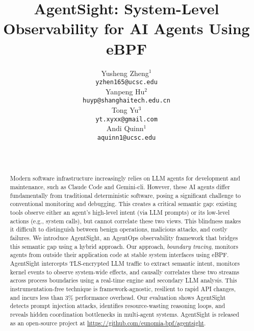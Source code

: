 \documentclass{article}
\title{AgentSight: System-Level Observability for AI Agents Using eBPF}
\author{%
  Yusheng Zheng$^{1}$ \\
  \texttt{yzhen165@ucsc.edu} \\
  \And
  Yanpeng Hu$^{2}$ \\
  \texttt{huyp@shanghaitech.edu.cn} \\
  \And
  Tong Yu$^{3}$ \\
  \texttt{yt.xyxx@gmail.com} \\
  \And
  Andi Quinn$^{1}$ \\
  \texttt{aquinn1@ucsc.edu} \\
  \And
  \multicolumn{4}{c}{$^{1}$UC Santa Cruz, Santa Cruz, CA, USA} \\
  \multicolumn{4}{c}{$^{2}$ShanghaiTech University, Shanghai, China} \\
  \multicolumn{4}{c}{$^{3}$eunomia-bpf Community, China}
}
\begin{document}
\maketitle


\begin{abstract}
    Modern software infrastructure increasingly relies on LLM agents for development and maintenance, such as Claude Code and Gemini-cli. However, these AI agents differ fundamentally from traditional deterministic software, posing a significant challenge to conventional monitoring and debugging. This creates a critical semantic gap: existing tools observe either an agent's high-level intent (via LLM prompts) or its low-level actions (e.g., system calls), but cannot correlate these two views. This blindness makes it difficult to distinguish between benign operations, malicious attacks, and costly failures. We introduce AgentSight, an AgentOps observability framework that bridges this semantic gap using a hybrid approach. Our approach, \emph{boundary tracing}, monitors agents from outside their application code at stable system interfaces using eBPF. AgentSight intercepts TLS-encrypted LLM traffic to extract semantic intent, monitors kernel events to observe system-wide effects, and causally correlates these two streams across process boundaries using a real-time engine and secondary LLM analysis. This instrumentation-free technique is framework-agnostic, resilient to rapid API changes, and incurs less than 3\% performance overhead. Our evaluation shows AgentSight detects prompt injection attacks, identifies resource-wasting reasoning loops, and reveals hidden coordination bottlenecks in multi-agent systems. AgentSight is released as an open-source project at \url{https://github.com/eunomia-bpf/agentsight}.
\end{abstract}



\maketitle
\pagestyle{plain}













\end{document}
